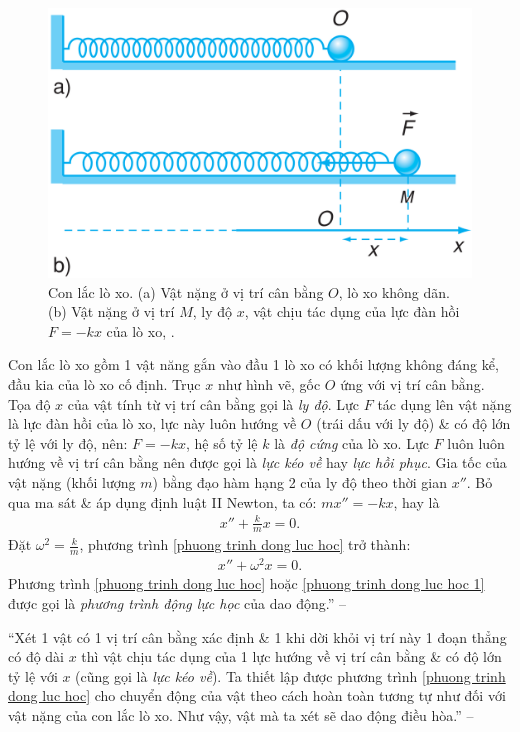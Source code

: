 \documentclass{article}
\numberwithin{equation}{section}
\begin{document}
\begin{figure}[H]
	\centering
	\includegraphics[scale=0.15]{con_lac_lo_xo}
	\caption{Con lắc lò xo. (a) Vật nặng ở vị trí cân bằng $O$, lò xo không dãn. (b) Vật nặng ở vị trí $M$, ly độ $x$, vật chịu tác dụng của lực đàn hồi $F = -kx$ của lò xo, \cite[Hình 6.3, p. 29]{SGK_Vat_Ly_12_nang_cao}.}
	\label{fig:con_lac_lo_xo}
\end{figure}
Con lắc lò xo gồm 1 vật năng gắn vào đầu 1 lò xo có khối lượng không đáng kể, đầu kia của lò xo cố định. Trục $x$ như hình vẽ, gốc $O$ ứng với vị trí cân bằng. Tọa độ $x$ của vật tính từ vị trí cân bằng gọi là \textit{ly độ}. Lực $F$ tác dụng lên vật nặng là lực đàn hồi của lò xo, lực này luôn hướng về $O$ (trái dấu với ly độ) \& có độ lớn tỷ lệ với ly độ, nên: $F = -kx$, hệ số tỷ lệ $k$ là \textit{độ cứng} của lò xo. Lực $F$ luôn luôn hướng về vị trí cân bằng nên được gọi là \textit{lực kéo về} hay \textit{lực hồi phục}. Gia tốc của vật nặng (khối lượng $m$) bằng đạo hàm hạng 2 của ly độ theo thời gian $x''$. Bỏ qua ma sát \& áp dụng định luật II Newton, ta có: $mx'' = -kx$, hay là
\begin{align}
	\label{phuong trinh dong luc hoc}
	x'' + \frac{k}{m}x = 0.
\end{align}
Đặt $\omega^2 = \frac{k}{m}$, phương trình \eqref{phuong trinh dong luc hoc} trở thành:
\begin{align}
	\label{phuong trinh dong luc hoc 1}
	x'' + \omega^2x = 0.
\end{align}
Phương trình \eqref{phuong trinh dong luc hoc} hoặc \eqref{phuong trinh dong luc hoc 1} được gọi là \textit{phương trình động lực học} của dao động.'' -- \cite[pp. 29--30]{SGK_Vat_Ly_12_nang_cao}

``Xét 1 vật có 1 vị trí cân bằng xác định \& 1 khi dời khỏi vị trí này 1 đoạn thẳng có độ dài $x$ thì vật chịu tác dụng của 1 lực hướng về vị trí cân bằng \& có độ lớn tỷ lệ với $x$ (cũng gọi là \textit{lực kéo về}). Ta thiết lập được phương trình \eqref{phuong trinh dong luc hoc} cho chuyển động của vật theo cách hoàn toàn tương tự như đối với vật nặng của con lắc lò xo. Như vậy, vật mà ta xét sẽ dao động điều hòa.'' -- \cite[p. 30]{SGK_Vat_Ly_12_nang_cao}
\end{document}

